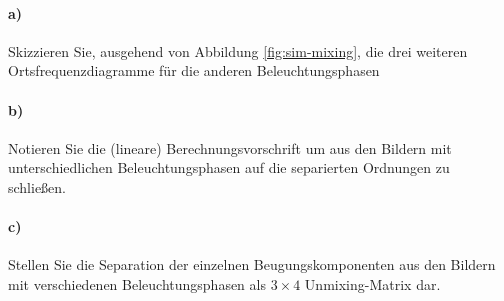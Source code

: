 \documentclass{article}
\begin{document}
\paragraph{a)} 
Skizzieren Sie, ausgehend von Abbildung \ref{fig:sim-mixing}, die
drei weiteren Ortsfrequenzdiagramme f\"ur die anderen Beleuchtungsphasen 

\paragraph{b)}
Notieren Sie die (lineare) Berechnungsvorschrift um aus den Bildern
mit unterschiedlichen Beleuchtungsphasen auf die separierten Ordnungen
zu schlie\ss en.

\paragraph{c)}
Stellen Sie die Separation der einzelnen Beugungskomponenten aus den
Bildern mit verschiedenen Beleuchtungsphasen als $3\times 4$
Unmixing-Matrix dar.



\end{document}
